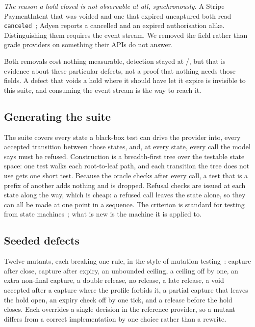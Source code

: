 \documentclass[conference]{IEEEtran}
\newcommand{\code}[1]{\texttt{\small #1}}
\begin{document}
\emph{The reason a hold closed is not observable at all, synchronously.} A
Stripe PaymentIntent that was voided and one that expired uncaptured both read
\code{canceled}~\cite{stripe2026hold}; Adyen reports a cancelled and an expired
authorisation alike. Distinguishing them requires the event stream. We removed
the field rather than grade providers on something their APIs do not answer.

Both removals cost nothing measurable, detection stayed at
\modeldetected{}/\killablemutants{}, but that is evidence about these
particular defects, not a proof that nothing needs those fields. A defect that
voids a hold where it should have let it expire is invisible to this suite, and
consuming the event stream is the way to reach it.

\subsection{Generating the suite}

The suite covers every state a black-box test can drive the provider into, every
accepted transition between those states, and, at every state, every call the
model says must be refused. Construction is a breadth-first tree over the
testable state space: one test walks each root-to-leaf path, and each transition
the tree does not use gets one short test. Because the oracle checks after every
call, a test that is a prefix of another adds nothing and is dropped. Refusal
checks are issued at each state along the way, which is cheap: a refused call
leaves the state alone, so they can all be made at one point in a sequence. The
criterion is standard for testing from state machines~\cite{chow1978testing,
lee1996principles}; what is new is the machine it is applied to.

\subsection{Seeded defects}

Twelve mutants, each breaking one rule, in the style of mutation
testing~\cite{demillo1978hints, jia2011analysis}: capture after close, capture
after expiry, an unbounded ceiling, a ceiling off by one, an extra non-final
capture, a double release, no release, a late release, a void accepted after a
capture where the profile forbids it, a partial capture that leaves the hold
open, an expiry check off by one tick, and a release before the hold closes.
Each overrides a single decision in the reference provider, so a mutant differs
from a correct implementation by one choice rather than a rewrite.
\end{document}
